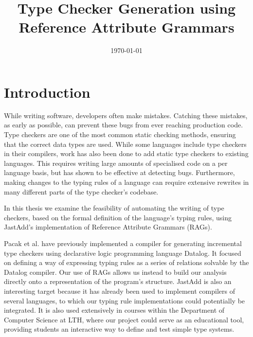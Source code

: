 \documentclass[nofilelist]{cslthse-msc}
\title{Type Checker Generation using Reference Attribute Grammars}
\date{\today}
\newcommand{\CR}[1]{\textcolor{green!60!black}{[\textbf{CR}:#1]}}
\begin{document}
\renewcommand{\bibname}{References}

\makefrontmatter
\chapter{Introduction} %
While writing software, developers often make mistakes.
Catching these mistakes, as early as possible, can prevent these bugs from ever reaching production code.
Type checkers are one of the most common static checking methods, ensuring that the correct data types are used.
While some languages include type checkers in their compilers, work has also been done to add static type checkers to existing languages.
This requires writing large amounts of specialised code on a per language basis, but has shown to be effective at detecting bugs\cite{10.1145/1985793.1985889}\cite{10.5555/1251375.1251384}\cite{10190394}.
Furthermore, making changes to the typing rules of a language can require extensive rewrites in many different parts of the type checker's codebase.

In this thesis we examine the feasibility of automating the writing of type checkers, based on the formal definition of the language's typing rules, using JastAdd's implementation of Reference Attribute Grammars (RAGs).

Pacak et al. have previously implemented a compiler for generating incremental type checkers using declarative logic programming language Datalog\cite{Pacak}.
It focused on defining a way of expressing typing rules as a series of relations solvable by the Datalog compiler.
Our use of RAGs allows us instead to build our analysis directly onto a representation of the program's structure.
JastAdd is also an interesting target because it has already been used to implement compilers of several languages, to which our typing rule implementations could potentially be integrated.
It is also used extensively in courses within the Department of Computer Science at LTH, where our project could serve as an educational tool, providing students an interactive way to define and test simple type systems.
\end{document}
